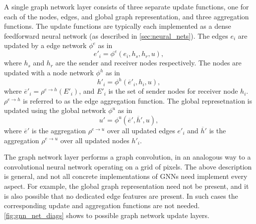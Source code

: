 A single graph network layer consists of three separate update functions, one for each of the nodes, edges, and global graph representation, and three aggregation functions.
The update functions are typically each implemented as a dense feedforward neural network (as described in \cref{sec:neural_nets}).
The edges $e_i$ are updated by a edge network $\phi^e$ as in 
%
\begin{equation}
    e'_i = \phi^e (e_i, h_s, h_r, u) , 
\end{equation}
%
where $h_s$ and $h_r$ are the sender and receiver nodes respectively.
The nodes are updated with a node network $\phi^h$ as in
%
\begin{equation}
    h'_i = \phi^h (\overline{e}'_i, h_i, u) , 
\end{equation}
%
where $\overline{e}'_i = \rho^{e \rightarrow h}(E'_i)$, and $E'_i$ is the set of sender nodes for receiver node $h_i$.
$\rho^{e \rightarrow h}$ is referred to as the edge aggregation function.
The global represetnation is updated using the global network $\phi^u$ as in
%
\begin{equation}
    u' = \phi^u (\overline{e}', \overline{h}', u),
\end{equation}
%
where $\overline{e}'$ is the aggregation $\rho^{e \rightarrow u}$ over all updated edges $e'_i$ and $\overline{h}'$ is the aggregation $\rho^{e \rightarrow u}$ over all updated nodes $h'_i$.

The graph network layer performs a graph convolution, in an analogous way to a convolutional neural network operating on a grid of pixels.
The above description is general, and not all concrete implementations of GNNs need implement every aspect.
For example, the global graph representation need not be present, and it is also possible that no dedicated edge features are present.
In such cases the corresponding update and aggregation functions are not needed.
\cref{fig:gnn_net_diags} shows to possible graph network update layers.


